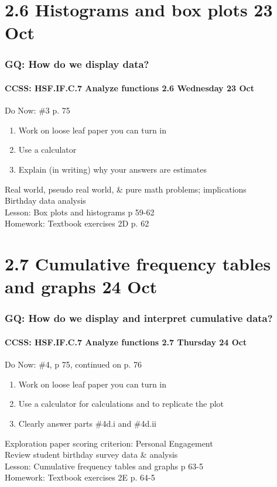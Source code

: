\documentclass{beamer}
\begin{document}
  \section{2.6 Histograms and box plots 23 Oct}
  \frame
  {
    \frametitle{GQ: How do we display data?}
    \framesubtitle{CCSS: HSF.IF.C.7 Analyze functions \hfill \alert{2.6 Wednesday 23 Oct}}

    \begin{block}{Do Now: \#3 p. 75}
    \begin{enumerate}
        \item Work on loose leaf paper you can turn in
        \item Use a calculator
        \item Explain (in writing) why your answers are estimates
    \end{enumerate}
    \end{block}
    Real world, pseudo real world, \& pure math problems; implications \\
    Birthday data analysis \\
    Lesson: Box plots and histograms p 59-62\\ \smallskip
    Homework: Textbook exercises 2D p. 62
  }

  \section{2.7 Cumulative frequency tables and graphs 24 Oct}
  \frame
  {
    \frametitle{GQ: How do we display and interpret cumulative data?}
    \framesubtitle{CCSS: HSF.IF.C.7 Analyze functions \hfill \alert{2.7 Thursday 24 Oct}}

    \begin{block}{Do Now: \#4, p 75, continued on p. 76}
    \begin{enumerate}
        \item Work on loose leaf paper you can turn in
        \item Use a calculator for calculations and to replicate the plot
        \item Clearly answer parts \#4d.i and \#4d.ii
    \end{enumerate}
    \end{block}
    Exploration paper scoring criterion: Personal Engagement \\
    Review student birthday survey data \& analysis \\
    Lesson: Cumulative frequency tables and graphs p 63-5\\ \smallskip
    Homework: Textbook exercises 2E p. 64-5
  }
\end{document}
